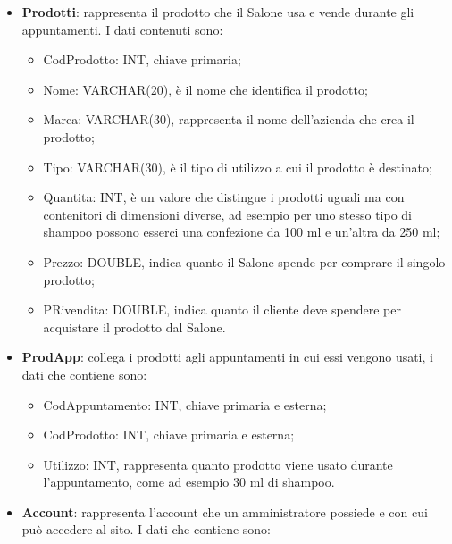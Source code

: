 {{\begin{itemize}
\begin{itemize}
						\item CodCliente: INT, chiave esterna;
						\item DataOra: DATETIME, è un formato che contiene una data e un'ora, la prima è strutturata in modo uguale a DataNascita di Clienti, l'ora invece ha un formato del tipo hh:mm:ss, dove 'h' rappresenta le cifre dell'ora, 'm' quelle dei minuti e 's' quelle dei secondi;
						\item CodTipoAppuntamento: INT, chiave esterna.
					\end{itemize}
				\item \textbf{Prodotti}: rappresenta il prodotto che il Salone usa e vende durante gli appuntamenti. I dati contenuti sono:
					\begin{itemize}\itemsep1pt
						\item CodProdotto: INT, chiave primaria;
						\item Nome: VARCHAR(20), è il nome che identifica il prodotto;
						\item Marca: VARCHAR(30), rappresenta il nome dell'azienda che crea il prodotto;
						\item Tipo: VARCHAR(30), è il tipo di utilizzo a cui il prodotto è destinato;
						\item Quantita: INT, è un valore che distingue i prodotti uguali ma con contenitori di dimensioni diverse, ad esempio per uno stesso tipo di shampoo possono esserci una confezione da 100 ml e un'altra da 250 ml;
						\item Prezzo: DOUBLE, indica quanto il Salone spende per comprare il singolo prodotto;
						\item PRivendita: DOUBLE, indica quanto il cliente deve spendere per acquistare il prodotto dal Salone.
					\end{itemize}
				\item \textbf{ProdApp}: collega i prodotti agli appuntamenti in cui essi vengono usati, i dati che contiene sono:
					\begin{itemize}\itemsep1pt
						\item CodAppuntamento: INT, chiave primaria e esterna;
						\item CodProdotto: INT, chiave primaria e esterna;
						\item Utilizzo: INT, rappresenta quanto prodotto viene usato durante l'appuntamento, come ad esempio 30 ml di shampoo.
					\end{itemize}
				\item \textbf{Account}: rappresenta l'account che un amministratore possiede e con cui può accedere al sito. I dati che contiene sono:

\end{itemize}}}
